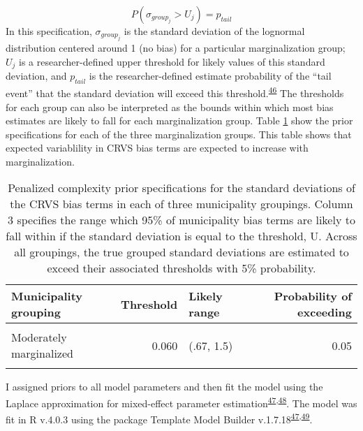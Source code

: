 \documentclass[
]{article}
\begin{document}
\[P(\sigma_{group_j} > U_j) = p_{tail}\]
In this specification, \(\sigma_{group_j}\) is the standard deviation of the lognormal distribution centered around 1 (no bias) for a particular marginalization group; \(U_j\) is a researcher-defined upper threshold for likely values of this standard deviation, and \(p_{tail}\) is the researcher-defined estimate probability of the ``tail event'' that the standard deviation will exceed this threshold.\textsuperscript{\protect\hyperlink{ref-Simpson2017}{46}} The thresholds for each group can also be interpreted as the bounds within which most bias estimates are likely to fall for each marginalization group. Table \ref{tab:priors} show the prior specifications for each of the three marginalization groups. This table shows that expected variablility in CRVS bias terms are expected to increase with marginalization.

\begin{table}[!h]

\caption{\label{tab:priors}Penalized complexity prior specifications for the standard deviations of the CRVS bias terms in each of three municipality groupings. Column 3 specifies the range which 95\% of municipality bias terms are likely to fall within if the standard deviation is equal to the threshold, U. Across all groupings, the true grouped standard deviations are estimated to exceed their associated thresholds with 5\% probability.}
\centering
\begin{tabular}[t]{lrlr}
\toprule
Municipality grouping & Threshold & Likely range & Probability of exceeding\\
\midrule
\cellcolor{gray!6}{Less marginalized} & \cellcolor{gray!6}{0.014} & \cellcolor{gray!6}{(.91, 1.1)} & \cellcolor{gray!6}{0.05}\\
Moderately marginalized & 0.060 & (.67, 1.5) & 0.05\\
\cellcolor{gray!6}{Most marginalized} & \cellcolor{gray!6}{0.102} & \cellcolor{gray!6}{(.5, 2)} & \cellcolor{gray!6}{0.05}\\
\bottomrule
\end{tabular}
\end{table}

I assigned priors to all model parameters and then fit the model using the Laplace approximation for mixed-effect parameter estimation\textsuperscript{\protect\hyperlink{ref-Kristensen2016}{47},\protect\hyperlink{ref-Thorson2016}{48}}⁠. The model was fit in R v.4.0.3 using the package Template Model Builder v.1.7.18\textsuperscript{\protect\hyperlink{ref-Kristensen2016}{47},\protect\hyperlink{ref-RCoreTeam2018}{49}}.
\end{document}
